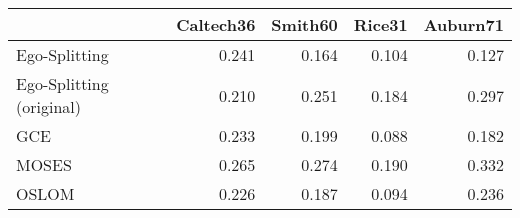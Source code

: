 \begin{tabular}{lrrrr}
\toprule
{} & Caltech36 & Smith60 & Rice31 & Auburn71 \\
\midrule
Ego-Splitting            &     0.241 &   0.164 &  0.104 &    0.127 \\
Ego-Splitting (original) &     0.210 &   0.251 &  0.184 &    0.297 \\
GCE                      &     0.233 &   0.199 &  0.088 &    0.182 \\
MOSES                    &     0.265 &   0.274 &  0.190 &    0.332 \\
OSLOM                    &     0.226 &   0.187 &  0.094 &    0.236 \\
\bottomrule
\end{tabular}

